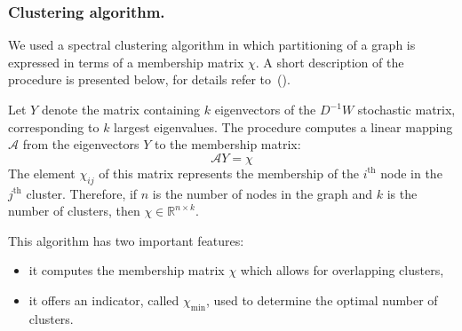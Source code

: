 \subsubsection*{Clustering algorithm.}
We used a spectral clustering algorithm in which partitioning of a graph is expressed in terms of a membership matrix $\chi$.
A short description of the procedure is presented below, for details refer to~(\cite{weber2004perron}).

Let $Y$ denote the matrix containing $k$ eigenvectors of the $D^{-1}W$ stochastic matrix, corresponding to $k$ largest eigenvalues.
The procedure computes a linear mapping $\mathcal{A}$ from the eigenvectors $Y$ to the membership matrix:
\begin{displaymath}
\mathcal{A} Y = \chi
\end{displaymath}
The element $\chi_{ij}$ of this matrix represents the membership of the $i^{\textrm{th}}$ node in the $j^{\textrm{th}}$ cluster.
Therefore, if $n$ is the number of nodes in the graph and $k$ is the number of clusters, then $\chi\in\mathbb{R}^{n\times k}$.

This algorithm has two important features:
\begin{itemize}
\item it computes the membership matrix $\chi$ which allows for overlapping clusters,
\item it offers an indicator, called $\chi_{\text{min}}$, used to determine the optimal number of clusters.
\end{itemize}

